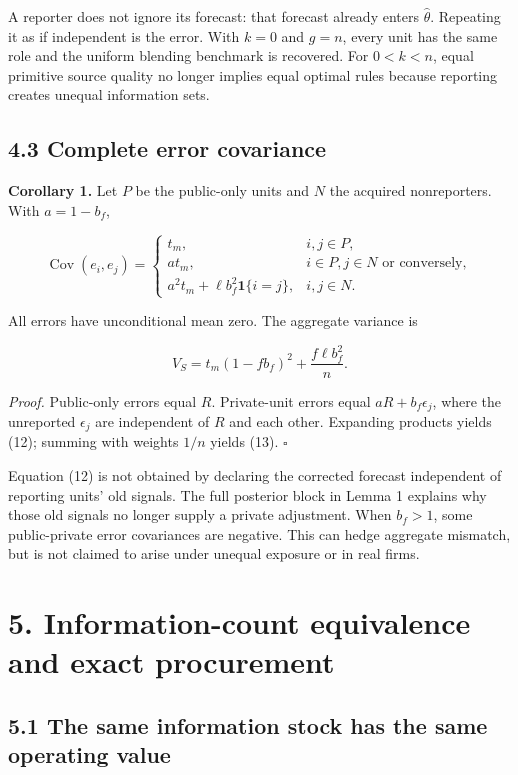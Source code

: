 \documentclass[
  11pt,
]{article}
\begin{document}
A reporter does not ignore its forecast: that forecast already enters
\(\widehat\theta\). Repeating it as if independent is the error. With
\(k=0\) and \(g=n\), every unit has the same role and the uniform
blending benchmark is recovered. For \(0<k<n\), equal primitive source
quality no longer implies equal optimal rules because reporting creates
unequal information sets.

\subsection{4.3 Complete error
covariance}\label{complete-error-covariance}

\textbf{Corollary 1.} Let \(P\) be the public-only units and \(N\) the
acquired nonreporters. With \(a=1-b_f\),

\[\operatorname{Cov}(e_i,e_j)=
\begin{cases}
t_m,&i,j\in P,\\
a t_m,&i\in P,j\in N\text{ or conversely},\\
a^2t_m+\ell b_f^2\mathbf1\{i=j\},&i,j\in N.
\end{cases} \tag{12}\]

All errors have unconditional mean zero. The aggregate variance is

\[V_S=t_m(1-fb_f)^2+\frac{f\ell b_f^2}{n}. \tag{13}\]

\emph{Proof.} Public-only errors equal \(R\). Private-unit errors equal
\(aR+b_f\epsilon_j\), where the unreported \(\epsilon_j\) are
independent of \(R\) and each other. Expanding products yields (12);
summing with weights \(1/n\) yields (13). \(\square\)

Equation (12) is not obtained by declaring the corrected forecast
independent of reporting units' old signals. The full posterior block in
Lemma 1 explains why those old signals no longer supply a private
adjustment. When \(b_f>1\), some public-private error covariances are
negative. This can hedge aggregate mismatch, but is not claimed to arise
under unequal exposure or in real firms.

\section{5. Information-count equivalence and exact
procurement}\label{information-count-equivalence-and-exact-procurement}

\subsection{5.1 The same information stock has the same operating
value}\label{the-same-information-stock-has-the-same-operating-value}
\end{document}
